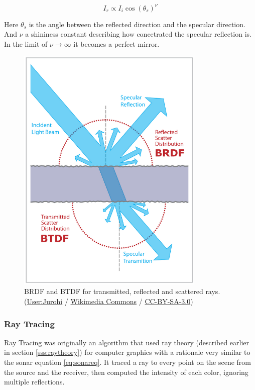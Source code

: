 \begin{equation}
\label{eq:phong}
I_r \propto	 I_i \cos(\theta_s)^\nu
\end{equation} 

Here $\theta_s$ is the angle between the reflected direction and the specular
direction. And $\nu$ a shininess constant describing how concetrated the
specular reflection is. In the limit of $\nu \to \infty$ it becomes a perfect mirror.


\begin{figure}
	\centering
	\includegraphics[width=0.8\textwidth]{Chap2/fig/BRDF_BTDF}
	\caption{BRDF and BTDF for transmitted, reflected and scattered rays.
	(\textcopyright  \href{http://commons.wikimedia.org/wiki/User:Jurohi}{User:Jurohi} /
	\href{http://commons.wikimedia.org/}{Wikimedia Commons} /
	\href{http://creativecommons.org/licenses/by-sa/3.0/}{CC-BY-SA-3.0})}
	\label{fig:brdfbtdf}
\end{figure}




\subsubsection{Ray Tracing}

Ray Tracing was originally an algorithm that used ray theory
(described earlier in section \ref{sss:raytheory}) for computer graphics with a
rationale very similar to the sonar equation \ref{eq:sonareq}. It traced a ray to every point on the scene
from the source and the receiver, then computed the intensity of each color,
ignoring multiple reflections. 


